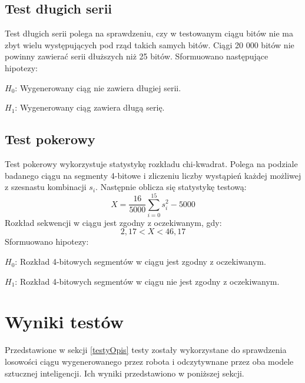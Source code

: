 \subsection{Test długich serii}
Test długich serii polega na sprawdzeniu, czy w testowanym ciągu bitów nie ma zbyt wielu występujących pod rząd takich 
samych bitów. Ciągi 20 000 bitów nie powinny zawierać serii dłuższych niż 25 bitów. Sformuowano następujące hipotezy:
\par \begin{math} H_0 \end{math}: Wygenerowany ciąg nie zawiera długiej serii.
\par \begin{math} H_1 \end{math}: Wygenerowany ciąg zawiera długą serię.

\subsection{Test pokerowy}
\label{pokerowyOpis}
Test pokerowy wykorzystuje statystykę rozkładu chi-kwadrat. Polega na podziale badanego ciągu na segmenty 4-bitowe i 
zliczeniu liczby wystąpień każdej możliwej z szesnastu kombinacji \begin{math}s_i\end{math}. Następnie oblicza się 
statystykę testową:
\begin{displaymath}
    X = \frac{16}{5000} \sum^{15}_{i=0} s_i^2 - 5000
\end{displaymath}
Rozkład sekwencji w ciągu jest zgodny z oczekiwanym, gdy:
\begin{displaymath}
    2{,}17 < X < 46{,}17
\end{displaymath}
Sformuowano hipotezy:
\par \begin{math} H_0 \end{math}: Rozkład 4-bitowych segmentów w ciągu jest zgodny z oczekiwanym.
\par \begin{math} H_1 \end{math}: Rozkład 4-bitowych segmentów w ciągu nie jest zgodny z oczekiwanym.



\section{Wyniki testów}
Przedstawione w sekcji \ref{testyOpis} testy zostały wykorzystane do sprawdzenia losowości ciągu wygenerowanego przez robota i 
odczytywnane przez oba modele sztucznej inteligencji. Ich wyniki przedstawiono w poniższej sekcji.
